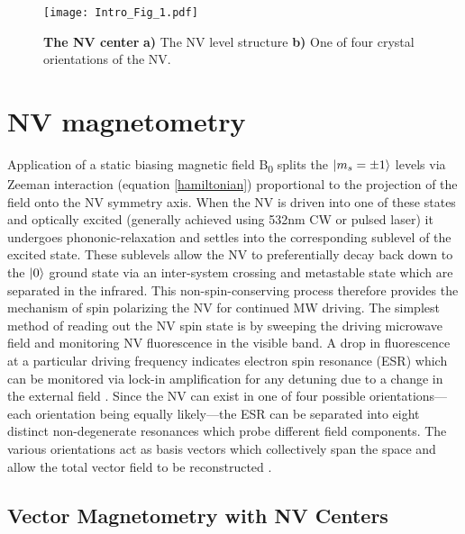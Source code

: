 \begin{figure}[t!]
\centering
\texttt{[image: Intro\_Fig\_1.pdf]}  
\caption{\textbf{The NV center} \textbf{a)} The NV level structure \textbf{b)} One of four crystal orientations of the NV.}
\label{Fig_one}
\end{figure}

\section{NV magnetometry} %

Application of a static biasing magnetic field B\textsubscript{0} splits the $\ket{m_s = \pm1}$ levels via Zeeman interaction (equation \ref{hamiltonian}) proportional to the projection of the field onto the NV symmetry axis. When the NV is driven into one of these states and optically excited (generally achieved using 532nm CW or pulsed laser) it undergoes phononic-relaxation and settles into the corresponding sublevel of the excited state. These sublevels allow the NV to preferentially decay back down to the $\ket{0}$ ground state via an inter-system crossing and metastable state which are separated in the infrared. This non-spin-conserving process therefore provides the mechanism of spin polarizing the NV for continued MW driving. The simplest method of reading out the NV spin state is by sweeping the driving microwave field and monitoring NV fluorescence in the visible band. A drop in fluorescence at a particular driving frequency indicates electron spin resonance (ESR) which can be monitored via lock-in amplification for any detuning due to a change in the external field \cite{jensen2017magnetometry,rondin2014magnetometry}. Since the NV can exist in one of four possible orientations---each orientation being equally likely---the ESR can be separated into eight distinct non-degenerate resonances which probe different field components. The various orientations act as basis vectors which collectively span the space and allow the total vector field to be reconstructed \cite{jensen2017magnetometry}. 

\subsection{Vector Magnetometry with NV Centers}\label{ch1:vect}

